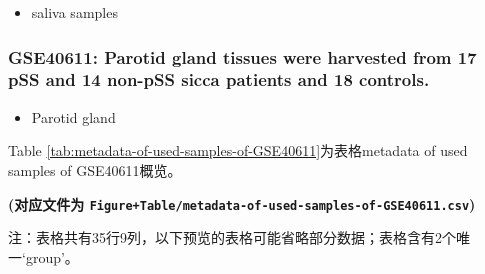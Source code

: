 \documentclass[
]{article}
\providecommand{\tightlist}{%
  \setlength{\itemsep}{0pt}\setlength{\parskip}{0pt}}
\begin{document}
\begin{itemize}
\tightlist
\item
  saliva samples
\end{itemize}

\hypertarget{gse40611-parotid-gland-tissues-were-harvested-from-17-pss-and-14-non-pss-sicca-patients-and-18-controls.}{%
\subsubsection{GSE40611: Parotid gland tissues were harvested from 17 pSS and 14 non-pSS sicca patients and 18 controls.}\label{gse40611-parotid-gland-tissues-were-harvested-from-17-pss-and-14-non-pss-sicca-patients-and-18-controls.}}

\begin{itemize}
\tightlist
\item
  Parotid gland
\end{itemize}

Table \ref{tab:metadata-of-used-samples-of-GSE40611}为表格metadata of used samples of GSE40611概览。

\textbf{(对应文件为 \texttt{Figure+Table/metadata-of-used-samples-of-GSE40611.csv})}

\begin{center}\begin{tcolorbox}[colback=gray!10, colframe=gray!50, width=0.9\linewidth, arc=1mm, boxrule=0.5pt]注：表格共有35行9列，以下预览的表格可能省略部分数据；表格含有2个唯一`group'。
\end{tcolorbox}
\end{center}
\end{document}
